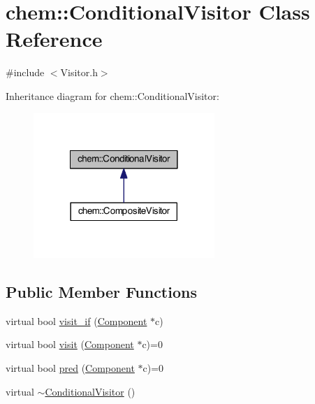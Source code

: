 \hypertarget{classchem_1_1ConditionalVisitor}{\section{chem\-:\-:Conditional\-Visitor Class Reference}
\label{classchem_1_1ConditionalVisitor}
}


{\ttfamily \#include $<$Visitor.\-h$>$}



Inheritance diagram for chem\-:\-:Conditional\-Visitor\-:\nopagebreak
\begin{figure}[H]
\begin{center}
\leavevmode
\includegraphics[width=194pt]{classchem_1_1ConditionalVisitor__inherit__graph}
\end{center}
\end{figure}
\subsection*{Public Member Functions}
\begin{DoxyCompactItemize}
\item 
virtual bool \hyperlink{classchem_1_1ConditionalVisitor_ac5eca1778f8647f7dc85a00489c3d938}{visit\-\_\-if} (\hyperlink{classchem_1_1Component}{Component} $\ast$c)
\item 
virtual bool \hyperlink{classchem_1_1ConditionalVisitor_aff08b8bc4b5c193e1fe60f06cca318b1}{visit} (\hyperlink{classchem_1_1Component}{Component} $\ast$c)=0
\item 
virtual bool \hyperlink{classchem_1_1ConditionalVisitor_ac35925bee54467373d1f44cccec75aa5}{pred} (\hyperlink{classchem_1_1Component}{Component} $\ast$c)=0
\item 
virtual \hyperlink{classchem_1_1ConditionalVisitor_ad4f7c23e000b587469b74455e5c1a8b7}{$\sim$\-Conditional\-Visitor} ()
\end{DoxyCompactItemize}


